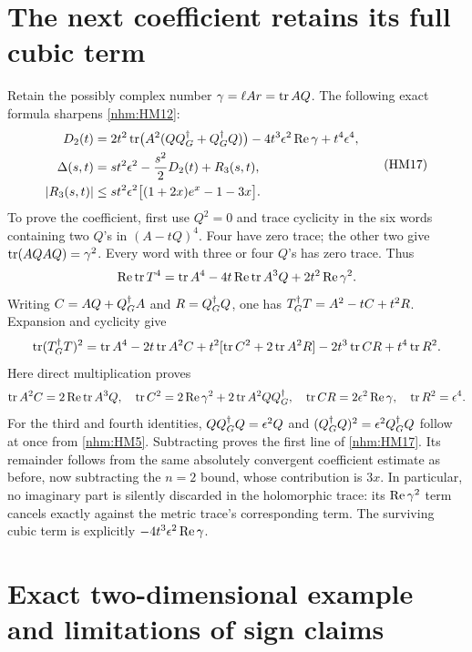 \documentclass[11pt]{article}
\begin{document}
\section{The next coefficient retains its full cubic term}

Retain the possibly complex number \(\gamma=\ell Ar=\operatorname{tr} AQ\).
The following exact formula sharpens \eqref{nhm:HM12}:
\begin{equation}
 \begin{split}
 D_2(t)={}&2t^2\operatorname{tr}\bigl(A^2(QQ^\dagger_G+Q^\dagger_G Q)\bigr)
       -4t^3\epsilon^2\operatorname{Re}\gamma+t^4\epsilon^4,\\
 \Delta(s,t)={}&s t^2\epsilon^2-\frac{s^2}{2}D_2(t)+R_3(s,t),\\
 |R_3(s,t)|\le{}&s t^2\epsilon^2
       \bigl[(1+2x)e^x-1-3x\bigr].
 \end{split}
 \tag{HM17}\label{nhm:HM17}
\end{equation}
To prove the coefficient, first use \(Q^2=0\) and trace cyclicity in the
six words containing two \(Q\)'s in \((A-tQ)^4\). Four have zero trace;
the other two give \(\operatorname{tr}(AQAQ)=\gamma^2\). Every word with three or four
\(Q\)'s has zero trace. Thus
\[
 \operatorname{Re}\operatorname{tr} T^4=\operatorname{tr} A^4-4t\operatorname{Re}\operatorname{tr} A^3Q+2t^2\operatorname{Re}\gamma^2.
\]
Writing \(C=AQ+Q^\dagger_G A\) and \(R=Q^\dagger_G Q\), one has
\(T^\dagger_G T=A^2-tC+t^2R\). Expansion and cyclicity give
\[
 \operatorname{tr}(T^\dagger_G T)^2=\operatorname{tr} A^4-2t\operatorname{tr} A^2C
  +t^2[\operatorname{tr} C^2+2\operatorname{tr} A^2R]-2t^3\operatorname{tr} CR+t^4\operatorname{tr} R^2.
\]
Here direct multiplication proves
\[
 \operatorname{tr} A^2C=2\operatorname{Re}\operatorname{tr} A^3Q,\quad
 \operatorname{tr} C^2=2\operatorname{Re}\gamma^2+2\operatorname{tr} A^2QQ^\dagger_G,
 \quad \operatorname{tr} CR=2\epsilon^2\operatorname{Re}\gamma,\quad \operatorname{tr} R^2=\epsilon^4.
\]
For the third and fourth identities, \(QQ^\dagger_G Q=\epsilon^2Q\) and
\((Q^\dagger_G Q)^2=\epsilon^2Q^\dagger_G Q\) follow at once from \eqref{nhm:HM5}.
Subtracting proves the first line of \eqref{nhm:HM17}. Its remainder follows
from the same absolutely convergent coefficient estimate as before, now
subtracting the \(n=2\) bound, whose contribution is \(3x\).
In particular, no imaginary part is silently discarded in the holomorphic
trace: its \(\operatorname{Re}\gamma^2\) term cancels exactly against the metric trace's
corresponding term. The surviving cubic term is explicitly
\(-4t^3\epsilon^2\operatorname{Re}\gamma\).

\section{Exact two-dimensional example and limitations of sign claims}
\end{document}

